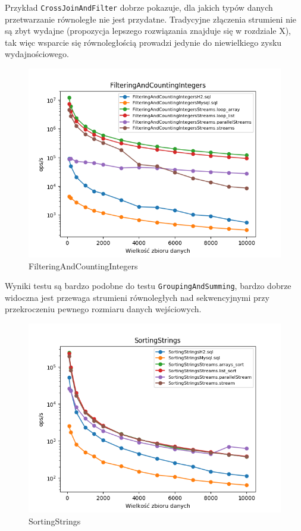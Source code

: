 \documentclass[12pt,twoside,openright]{extarticle}
\begin{document}
    Przykład \texttt{CrossJoinAndFilter} dobrze pokazuje, dla jakich typów danych przetwarzanie równoległe nie jest przydatne. Tradycyjne złączenia strumieni nie są zbyt wydajne (propozycja lepszego rozwiązania znajduje się w rozdziale X), tak więc wsparcie się równoległością prowadzi jedynie do niewielkiego zysku wydajnościowego.


\newpage
\begin{figure}[H]
\centering
\includegraphics[width=15cm]{plots/FilteringAndCountingIntegers}
\caption{FilteringAndCountingIntegers}
\end{figure}

    Wyniki testu są bardzo podobne do testu \texttt{GroupingAndSumming}, bardzo dobrze widoczna jest przewaga strumieni równoległych nad sekwencyjnymi przy przekroczeniu pewnego rozmiaru danych wejściowych.

\newpage
\begin{figure}[H]
\centering
\includegraphics[width=15cm]{plots/SortingStrings}
\caption{SortingStrings}
\end{figure}
\end{document}
